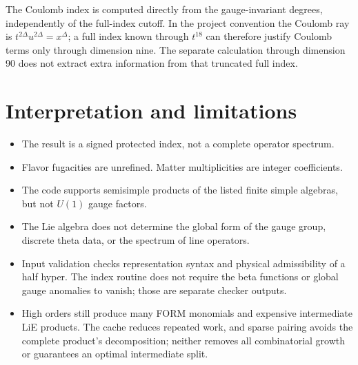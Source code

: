\documentclass[11pt,a4paper]{article}
\begin{document}
The Coulomb index is computed directly from the gauge-invariant degrees,
independently of the full-index cutoff. In the project convention the Coulomb
ray is $t^{2\Delta}u^{2\Delta}=x^\Delta$; a full index known through $t^{18}$
can therefore justify Coulomb terms only through dimension nine. The separate
calculation through dimension 90 does not extract extra information from that
truncated full index.

\clearpage


\clearpage
\section{Interpretation and limitations}\label{sec:limits}
\begin{itemize}
\item The result is a signed protected index, not a complete operator spectrum.
\item Flavor fugacities are unrefined. Matter multiplicities are integer coefficients.
\item The code supports semisimple products of the listed finite simple algebras,
but not $U(1)$ gauge factors.
\item The Lie algebra does not determine the global form of the gauge group,
discrete theta data, or the spectrum of line operators.
\item Input validation checks representation syntax and physical admissibility
of a half hyper. The index routine does not require the beta functions or global
gauge anomalies to vanish; those are separate checker outputs.
\item High orders still produce many FORM monomials and expensive intermediate
LiE products. The cache reduces repeated work, and sparse pairing avoids the
complete product's decomposition; neither removes all combinatorial growth or
guarantees an optimal intermediate split.
\end{itemize}

\clearpage
\end{document}
